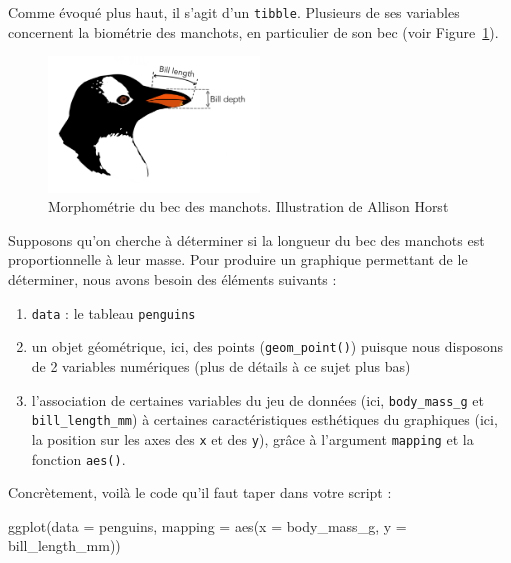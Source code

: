 \documentclass[
  letterpaper,
  DIV=11,
  numbers=noendperiod]{scrreprt}
\newenvironment{Shaded}{\begin{snugshade}}{\end{snugshade}}
\newcommand{\AttributeTok}[1]{\textcolor[rgb]{0.40,0.45,0.13}{#1}}
\newcommand{\FunctionTok}[1]{\textcolor[rgb]{0.28,0.35,0.67}{#1}}
\newcommand{\NormalTok}[1]{\textcolor[rgb]{0.00,0.23,0.31}{#1}}
\providecommand{\tightlist}{%
  \setlength{\itemsep}{0pt}\setlength{\parskip}{0pt}}\usepackage{longtable,booktabs,array}
\begin{document}
Comme évoqué plus haut, il s'agit d'un \texttt{tibble}. Plusieurs de ses
variables concernent la biométrie des manchots, en particulier de son
bec (voir Figure~\ref{fig-morpho}).

\begin{figure}

{\centering \includegraphics[width=0.5\textwidth,height=\textheight]{./images/culmen_depth.png}

}

\caption{\label{fig-morpho}Morphométrie du bec des manchots.
Illustration de Allison Horst}

\end{figure}

Supposons qu'on cherche à déterminer si la longueur du bec des manchots
est proportionnelle à leur masse. Pour produire un graphique permettant
de le déterminer, nous avons besoin des éléments suivants :

\begin{enumerate}
\def\labelenumi{\arabic{enumi}.}
\tightlist
\item
  \texttt{data} : le tableau \texttt{penguins}
\item
  un objet géométrique, ici, des points (\texttt{geom\_point()}) puisque
  nous disposons de 2 variables numériques (plus de détails à ce sujet
  plus bas)
\item
  l'association de certaines variables du jeu de données (ici,
  \texttt{body\_mass\_g} et \texttt{bill\_length\_mm}) à certaines
  caractéristiques esthétiques du graphiques (ici, la position sur les
  axes des \texttt{x} et des \texttt{y}), grâce à l'argument
  \texttt{mapping} et la fonction \texttt{aes()}.
\end{enumerate}

Concrètement, voilà le code qu'il faut taper dans votre script :

\begin{Shaded}
\begin{Highlighting}[]
\FunctionTok{ggplot}\NormalTok{(}\AttributeTok{data =}\NormalTok{ penguins, }\AttributeTok{mapping =} \FunctionTok{aes}\NormalTok{(}\AttributeTok{x =}\NormalTok{ body\_mass\_g, }\AttributeTok{y =}\NormalTok{ bill\_length\_mm))}
\end{Highlighting}
\end{Shaded}
\end{document}
